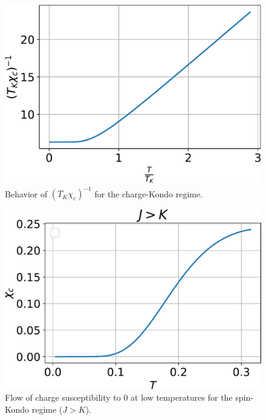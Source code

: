 \documentclass[twoside]{report}
\numberwithin{equation}{section}
\begin{document}
\begin{figure}[htpb]
	\centering
	\includegraphics[height=0.27\textheight]{../figures/one_over_chi_c_new.pdf}
	\caption{Behavior of \(\left(T_K \chi_c\right)^{-1}\) for the charge-Kondo regime.}
	\label{one_over_chic}
\end{figure}
\begin{figure}[htpb]
	\centering
	\includegraphics[width=0.4\textheight]{../figures/chi_c_zero_new.pdf}
	\caption{Flow of charge susceptibility to 0 at low temperatures for the spin-Kondo regime (\(J>K\)).}
	\label{chi_c_zero}
\end{figure}
\end{document}
